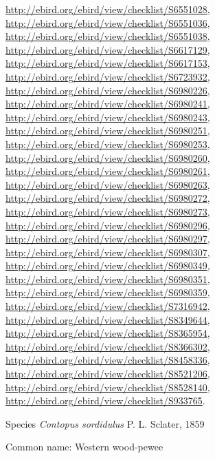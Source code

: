 \documentclass[9pt, article]{memoir}
\begin{document}
\begin{multicols}{2}
\url{http://ebird.org/ebird/view/checklist/S6551028}, 
\url{http://ebird.org/ebird/view/checklist/S6551036}, 
\url{http://ebird.org/ebird/view/checklist/S6551038}, 
\url{http://ebird.org/ebird/view/checklist/S6617129}, 
\url{http://ebird.org/ebird/view/checklist/S6617153}, 
\url{http://ebird.org/ebird/view/checklist/S6723932}, 
\url{http://ebird.org/ebird/view/checklist/S6980226}, 
\url{http://ebird.org/ebird/view/checklist/S6980241}, 
\url{http://ebird.org/ebird/view/checklist/S6980243}, 
\url{http://ebird.org/ebird/view/checklist/S6980251}, 
\url{http://ebird.org/ebird/view/checklist/S6980253}, 
\url{http://ebird.org/ebird/view/checklist/S6980260}, 
\url{http://ebird.org/ebird/view/checklist/S6980261}, 
\url{http://ebird.org/ebird/view/checklist/S6980263}, 
\url{http://ebird.org/ebird/view/checklist/S6980272}, 
\url{http://ebird.org/ebird/view/checklist/S6980273}, 
\url{http://ebird.org/ebird/view/checklist/S6980296}, 
\url{http://ebird.org/ebird/view/checklist/S6980297}, 
\url{http://ebird.org/ebird/view/checklist/S6980307}, 
\url{http://ebird.org/ebird/view/checklist/S6980349}, 
\url{http://ebird.org/ebird/view/checklist/S6980351}, 
\url{http://ebird.org/ebird/view/checklist/S6980359}, 
\url{http://ebird.org/ebird/view/checklist/S7316942}, 
\url{http://ebird.org/ebird/view/checklist/S8349644}, 
\url{http://ebird.org/ebird/view/checklist/S8365954}, 
\url{http://ebird.org/ebird/view/checklist/S8366302}, 
\url{http://ebird.org/ebird/view/checklist/S8458336}, 
\url{http://ebird.org/ebird/view/checklist/S8521206}, 
\url{http://ebird.org/ebird/view/checklist/S8528140}, 
\url{http://ebird.org/ebird/view/checklist/S933765}.

\vspace{6pt}\noindent\hspace{36pt}Species \textit{Contopus sordidulus} P. L. Sclater, 1859


Common name: Western wood-pewee


\end{multicols}
\end{document}
